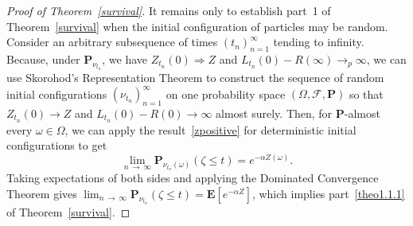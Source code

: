 \documentclass[AHL,Unicode,longabstracts,published]{cedram}
\newcommand*\E{\mathbf{E}}
\renewcommand*\P{\mathbf{P}}
\newcommand\F{\mathcal{F}}
\newcommand{\1} {\mathds{1}}
\begin{document}
\begin{proof}[Proof of Theorem~\ref{survival}]
It remains only to establish part~1 of Theorem~\ref{survival} when the initial configuration of particles may be random. Consider an arbitrary subsequence of times $(t_n)_{n=1}^{\infty}$ tending to infinity. Because, under $\P_{\nu_{t_n}}$, we have $Z_{t_n}(0) \Rightarrow Z$ and $L_{t_n}(0) - R(\infty) \rightarrow_p \infty$, we can use Skorohod's Representation Theorem to construct the sequence of random initial configurations $(\nu_{t_n})_{n=1}^{\infty}$ on one probability space $(\Omega, \F, \P)$ so that $Z_{t_n}(0) \rightarrow Z$ and $L_{t_n}(0) - R(0) \rightarrow \infty$ almost surely. Then, for $\P$-almost every $\omega \in \Omega$, we can apply the result~\eqref{zpositive} for deterministic initial configurations to get
\[
\lim_{n\,\rightarrow\,\infty} \P_{\nu_{t_n}(\omega)}(\zeta \leq t) = e^{-\alpha Z(\omega)}.
\]
Taking expectations of both sides and applying the Dominated Convergence Theorem gives $\lim_{n\,\rightarrow\,\infty} \P_{\nu_{t_n}}(\zeta \leq t) = \E[e^{-\alpha Z}]$, which implies part~\eqref{theo1.1.1} of Theorem~\ref{survival}.
\end{proof}
\end{document}
